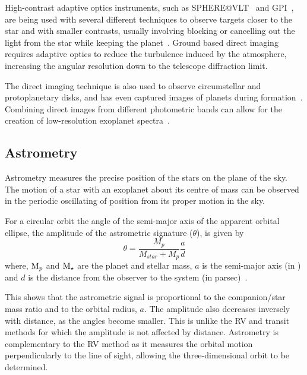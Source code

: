 High-contrast adaptive optics instruments, such as SPHERE@VLT~\citep{beuzit_sphere_2008} and GPI~\citep{macintosh_gemini_2008}, are being used with several different techniques to observe targets closer to the star and with smaller contrasts, usually involving blocking or cancelling out the light from the star while keeping the planet~\citep[e.g.][]{marois_direct_2005, mawet_annular_2005, schmid_zimpol_2005, sirbu_prospects_2017, sirbu_techniques_2017, wang_observing_2017}.
Ground based direct imaging requires adaptive optics to reduce the turbulence induced by the atmosphere, increasing the angular resolution down to the telescope diffraction limit.

The direct imaging technique is also used to observe circumstellar and protoplanetary disks, and has even captured images of planets during formation~\citep[e.g.][]{sallum_accreting_2015}.
Combining direct images from different photometric bands can allow for the creation of low-resolution exoplanet spectra~\citep[e.g.][]{kuzuhara_direct_2013, zurlo_new_2015}.


\subsection{Astrometry}

\label{subsec:astrometry}
Astrometry measures the precise position of the stars on the plane of the sky.
The motion of a star with an exoplanet about its centre of mass can be observed in the periodic oscillating of position from its proper motion in the sky.

For a circular orbit the angle of the semi-major axis of the apparent orbital ellipse, the amplitude of the astrometric signature ($\theta$), is given by
\begin{equation}
\theta = \frac{M_{p}}{M_{star} + M_{p}} \frac{a}{d}
\end{equation}
where, $\textrm{M}_{p}$ and $\textrm{M}_{\star}$ are the planet and stellar mass, $a$ is the semi-major axis (in \AU) and $d$ is the distance from the observer to the system (in parsec)~\citep{perryman_exoplanet_2011}.

This shows that the astrometric signal is proportional to the companion/star mass ratio and to the orbital radius, $a$.
The amplitude also decreases inversely with distance, as the angles become smaller.
This is unlike the {RV} and transit methods for which the amplitude is not affected by distance.
Astrometry is complementary to the {RV} method as it measures the orbital motion perpendicularly to the line of sight, allowing the three-dimensional orbit to be determined.

